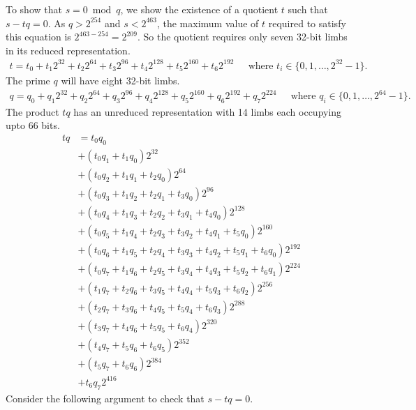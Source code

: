 \documentclass[a4paper, 12pt]{article}
\begin{document}
To show that $s = 0 \bmod q$, we show the existence of a quotient $t$ such that $s-tq = 0$. As $q > 2^{254}$ and $s < 2^{463}$, the maximum value of $t$ required to satisfy this equation is $2^{463-254} = 2^{209}$. So the quotient requires only seven 32-bit limbs in its reduced representation.
\begin{align*}
  t = t_0 + t_1 2^{32} +t_2 2^{64} + t_3 2^{96}+ t_4 2^{128} +   t_5 2^{160} + t_6 2^{192}\ \ \ \ \ \text{ where } t_i \in \{0,1,\ldots,2^{32}-1\}.
\end{align*}
The prime $q$ will have eight 32-bit limbs.
\begin{align*}
  q = q_0 + q_1 2^{32} + q_2 2^{64} + q_3 2^{96} + q_4 2^{128} +   q_5 2^{160} + q_6 2^{192}+ q_7 2^{224} \ \ \ \ \ \text{ where } q_i \in \{0,1,\ldots,2^{64}-1\}.
\end{align*}
The product $tq$ has an unreduced representation with 14 limbs each occupying upto 66 bits.
\begin{align*}
  tq  &= t_0q_0\\
      & + (t_0q_1 + t_1q_0) 2^{32}\\
      & + (t_0q_2 + t_1q_1 + t_2q_0) 2^{64}\\
      & + (t_0q_3 + t_1q_2 + t_2q_1 + t_3q_0) 2^{96}\\
      & + (t_0q_4 + t_1q_3 + t_2q_2 + t_3q_1 + t_4q_0) 2^{128}\\
      & + (t_0q_5 + t_1q_4 + t_2q_3 + t_3q_2 + t_4q_1 + t_5q_0) 2^{160}\\
      & + (t_0q_6 + t_1q_5 + t_2q_4 + t_3q_3 + t_4q_2 + t_5q_1 + t_6q_0) 2^{192}\\
      & + (t_0q_7 + t_1q_6 + t_2q_5 + t_3q_4 + t_4q_3 + t_5q_2 + t_6q_1) 2^{224}\\
      & + (t_1q_7 + t_2q_6 + t_3q_5 + t_4q_4 + t_5q_3 + t_6q_2) 2^{256}\\
      & + (t_2q_7 + t_3q_6 + t_4q_5 + t_5q_4 + t_6q_3) 2^{288}\\
      & + (t_3q_7 + t_4q_6 + t_5q_5 + t_6q_4) 2^{320}\\
      & + (t_4q_7 + t_5q_6 + t_6q_5) 2^{352}\\
      & + (t_5q_7 + t_6q_6) 2^{384}\\
      & + t_6q_7 2^{416}
\end{align*}
Consider the following argument to check that $s-tq = 0$.
\end{document}
